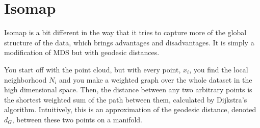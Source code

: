\section{Isomap} 

  Isomap is a bit different in the way that it tries to capture more of the global structure of the data, which brings advantages and disadvantages. It is simply a modification of MDS but with geodesic distances. 

  You start off with the point cloud, but with every point, $x_i$, you find the local neighborhood $N_i$ and you make a weighted graph over the whole dataset in the high dimensional space. Then, the distance between any two arbitrary points is the shortest weighted sum of the path between them, calculated by Dijkstra's algorithm. Intuitively, this is an approximation of the geodesic distance, denoted $d_G$, between these two points on a manifold. 
